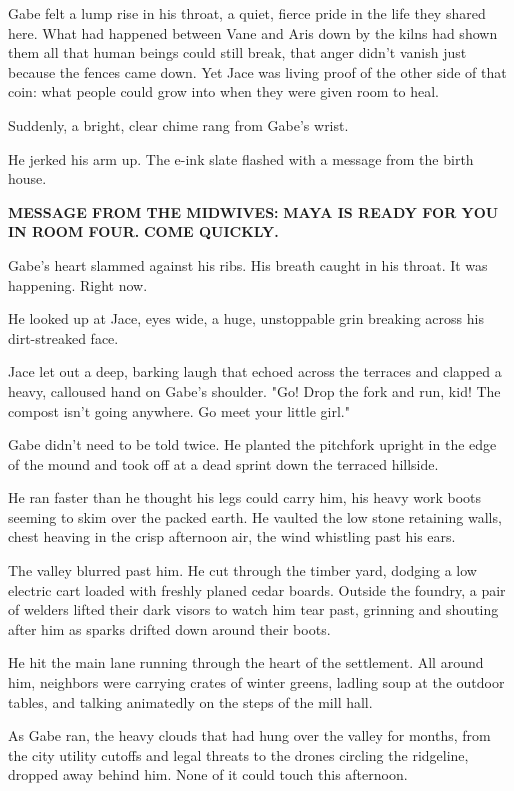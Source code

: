 Gabe felt a lump rise in his throat, a quiet, fierce pride in the life they shared here. What had happened between Vane and Aris down by the kilns had shown them all that human beings could still break, that anger didn't vanish just because the fences came down. Yet Jace was living proof of the other side of that coin: what people could grow into when they were given room to heal.

Suddenly, a bright, clear chime rang from Gabe's wrist. 

He jerked his arm up. The e-ink slate flashed with a message from the birth house. 

\textbf{MESSAGE FROM THE MIDWIVES:}
\textbf{MAYA IS READY FOR YOU IN ROOM FOUR.}
\textbf{COME QUICKLY.}

Gabe’s heart slammed against his ribs. His breath caught in his throat. It was happening. Right now. 

He looked up at Jace, eyes wide, a huge, unstoppable grin breaking across his dirt-streaked face. 

Jace let out a deep, barking laugh that echoed across the terraces and clapped a heavy, calloused hand on Gabe’s shoulder. "Go! Drop the fork and run, kid! The compost isn't going anywhere. Go meet your little girl."

Gabe didn't need to be told twice. He planted the pitchfork upright in the edge of the mound and took off at a dead sprint down the terraced hillside.

He ran faster than he thought his legs could carry him, his heavy work boots seeming to skim over the packed earth. He vaulted the low stone retaining walls, chest heaving in the crisp afternoon air, the wind whistling past his ears.

The valley blurred past him. He cut through the timber yard, dodging a low electric cart loaded with freshly planed cedar boards. Outside the foundry, a pair of welders lifted their dark visors to watch him tear past, grinning and shouting after him as sparks drifted down around their boots. 

He hit the main lane running through the heart of the settlement. All around him, neighbors were carrying crates of winter greens, ladling soup at the outdoor tables, and talking animatedly on the steps of the mill hall. 

As Gabe ran, the heavy clouds that had hung over the valley for months, from the city utility cutoffs and legal threats to the drones circling the ridgeline, dropped away behind him. None of it could touch this afternoon. 

